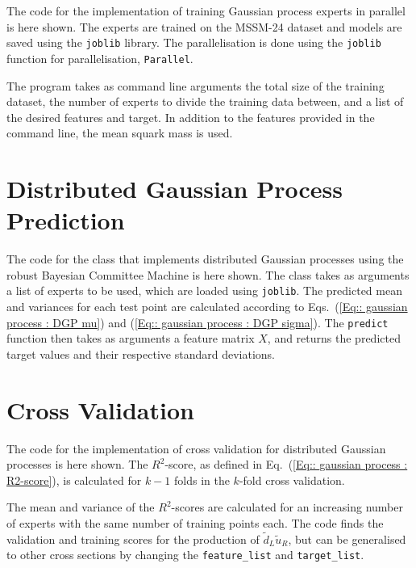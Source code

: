 \documentclass[twoside,english]{uiofysmaster}
\begin{document}
{{\begin{appendices}
The code for the implementation of training Gaussian process experts in parallel is here shown. The experts are trained on the MSSM-24 dataset and models are saved using the  \verb|joblib| library. The parallelisation is done using the \verb|joblib| function for parallelisation, \verb|Parallel|. 

The program takes as command line arguments the total size of the training dataset, the number of experts to divide the training data between, and a list of the desired features and target. In addition to the features provided in the command line, the mean squark mass is used.



\section{Distributed Gaussian Process Prediction}\label{App:Distributed Gaussian Process Prediction}

The code for the class that implements distributed Gaussian processes using the robust Bayesian Committee Machine is here shown. The class takes as arguments a list of experts to be used, which are loaded using \verb|joblib|. The predicted mean and variances for each test point are calculated according to Eqs.~(\ref{Eq:: gaussian process : DGP mu}) and (\ref{Eq:: gaussian process : DGP sigma}). The \verb|predict| function then takes as arguments a feature matrix $X$, and returns the predicted target values and their respective standard deviations. 



\section{Cross Validation}\label{App:Cross validation}

The code for the implementation of cross validation for distributed Gaussian processes is here shown. The $R^2$-score, as defined in Eq.~(\ref{Eq:: gaussian process : R2-score}), is calculated for $k-1$ folds in the $k$-fold cross validation.

 The mean and variance of the $R^2$-scores are calculated for an increasing number of experts with the same number of training points each. The code finds the validation and training scores for the production of $\widetilde{d}_L \widetilde{u}_R$, but can be generalised to other cross sections by changing the \verb|feature_list| and \verb|target_list|.


\end{appendices}}}
\end{document}
